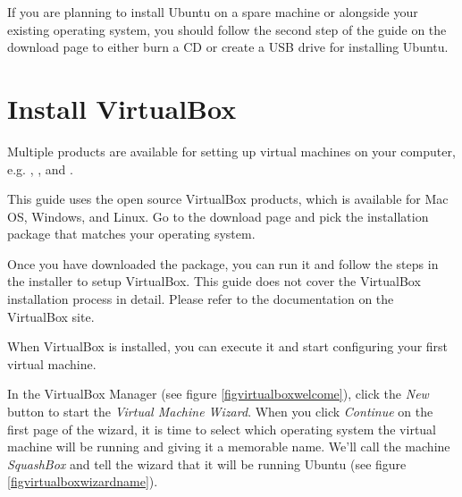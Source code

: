 \documentclass[draft,ebook,10pt,twoside,openright]{memoir}
\begin{document}

If you are planning to install Ubuntu on a spare machine or alongside your existing operating system, you should follow the second step of the guide on the download page to either burn a CD or create a USB drive for installing Ubuntu.

\section{Install VirtualBox} \label{secinstallvirtualbox}

Multiple products are available for setting up virtual machines on your computer, e.g. , , and .

This guide uses the open source VirtualBox products, which is available for Mac OS, Windows, and Linux. Go to the download page and pick the installation package that matches your operating system.


Once you have downloaded the package, you can run it and follow the steps in the installer to setup VirtualBox. This guide does not cover the VirtualBox installation process in detail. Please refer to the documentation on the VirtualBox site.

When VirtualBox is installed, you can execute it and start configuring your first virtual machine.


In the VirtualBox Manager (see figure \ref{figvirtualboxwelcome}), click the \emph{New} button to start the \emph{Virtual Machine Wizard}. When you click \emph{Continue} on the first page of the wizard, it is time to select which operating system the virtual machine will be running and giving it a memorable name. We'll call the machine \emph{SquashBox} and tell the wizard that it will be running Ubuntu (see figure \ref{figvirtualboxwizardname}).

\end{document}
